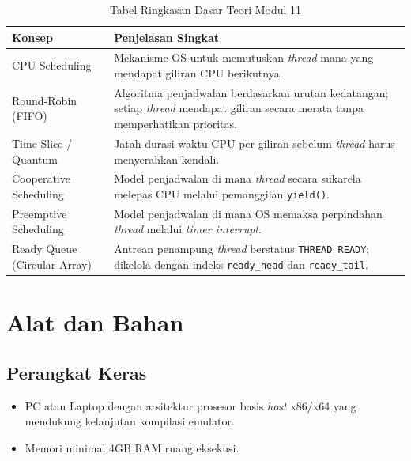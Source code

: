 \begin{table}[htbp]
	\caption{Tabel Ringkasan Dasar Teori Modul 11}
	\label{tab:m11-dasar-teori}
	\centering
	\begin{tabulary}{\textwidth}{|L|L|}
		\hline
		\textbf{Konsep} & \textbf{Penjelasan Singkat} \\ \hline
		CPU Scheduling
		& Mekanisme OS untuk memutuskan \textit{thread} mana yang mendapat giliran CPU berikutnya. \\ \hline
		Round-Robin (FIFO)
		& Algoritma penjadwalan berdasarkan urutan kedatangan; setiap \textit{thread} mendapat giliran secara merata tanpa memperhatikan prioritas. \\ \hline
		Time Slice / Quantum
		& Jatah durasi waktu CPU per giliran sebelum \textit{thread} harus menyerahkan kendali. \\ \hline
		Cooperative Scheduling
		& Model penjadwalan di mana \textit{thread} secara sukarela melepas CPU melalui pemanggilan \texttt{yield()}. \\ \hline
		Preemptive Scheduling
		& Model penjadwalan di mana OS memaksa perpindahan \textit{thread} melalui \textit{timer interrupt}. \\ \hline
		Ready Queue (Circular Array)
		& Antrean penampung \textit{thread} berstatus \texttt{THREAD\_READY}; dikelola dengan indeks \texttt{ready\_head} dan \texttt{ready\_tail}. \\ \hline
	\end{tabulary}
\end{table}

\newpage
\section{Alat dan Bahan}
\label{sec:m11-alat-bahan}

\subsection{Perangkat Keras}
\begin{itemize}
	\item PC atau Laptop dengan arsitektur prosesor basis \textit{host} x86/x64 yang mendukung kelanjutan kompilasi emulator.
	\item Memori minimal 4GB RAM ruang eksekusi.
\end{itemize}

